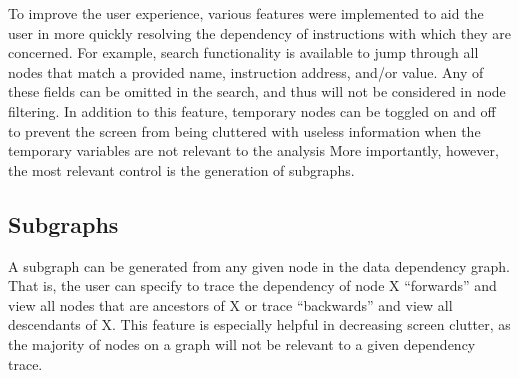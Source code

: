 To improve the user experience, various features were implemented to aid the user in more quickly resolving the dependency of instructions with which they are concerned. For example, search functionality is available to jump through all nodes that match a provided name, instruction address, and/or value. Any of these fields can be omitted in the search, and thus will not be considered in node filtering. In addition to this feature, temporary nodes can be toggled on and off to prevent the screen from being cluttered with useless information when the temporary variables are not relevant to the analysis More importantly, however, the most relevant control is the generation of subgraphs. 

\subsection{Subgraphs}
 A subgraph can be generated from any given node in the data dependency graph. That is, the user can specify to trace the dependency of node X “forwards” and view all nodes that are ancestors of X or trace “backwards” and view all descendants of X. This feature is especially helpful in decreasing screen clutter, as the majority of nodes on a graph will not be relevant to a given dependency trace. 